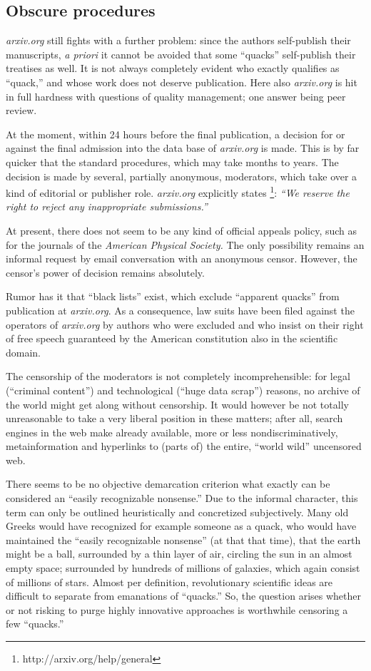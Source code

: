 \subsection{Obscure procedures}

{\it arxiv.org} still fights with a further problem:  since the authors
self-publish their manuscripts, {\it a priori} it cannot be avoided
that some ``quacks'' self-publish their treatises as well.  It is not
always completely evident who exactly qualifies as ``quack,'' and
whose work does not deserve publication.  Here also {\it arxiv.org} is
hit in full hardness with questions of quality management; one answer
being peer review.

At the moment,
within 24 hours before the final publication, a decision for or against
the final admission into the data base of {\it arxiv.org} is made.  This
is by far quicker that the standard procedures, which may take months to
years.  The decision is made by several, partially anonymous,
moderators, which take over a kind of editorial or publisher role.  {\it arxiv.org}
explicitly states \footnote{ http://arxiv.org/help/general}:
{\em ``We reserve the right to reject any inappropriate submissions.''}

At present, there does not seem to be any kind of official appeals
policy, such as for the journals of the {\it American Physical Society.}
The only possibility remains an informal request by email conversation
with an anonymous censor.  However, the censor's power of decision
remains absolutely.

Rumor has it that ``black lists'' exist, which exclude ``apparent
quacks'' from publication at {\it arxiv.org}.  As a consequence, law
suits have been filed against the operators of {\it arxiv.org} by
authors who were excluded and who insist on their right of free speech
guaranteed by the American constitution also in the scientific domain.

The censorship of the moderators is not completely incomprehensible:
 for legal (``criminal content'') and
technological (``huge data scrap'') reasons, no archive of the world
 might get along without censorship.
It would however be not totally unreasonable to take a
very liberal position in these matters; after all, search engines in
the web make already available, more or less nondiscriminatively,
metainformation and hyperlinks to (parts of) the entire, ``world wild''
uncensored web.

There seems to be no objective demarcation criterion what exactly can be
considered an ``easily recognizable nonsense.''  Due to the informal
character, this term can only be outlined heuristically and concretized
subjectively.  Many old Greeks would have recognized for example someone
as a quack, who would have maintained the ``easily recognizable
nonsense'' (at that that time), that the earth might be a ball,
surrounded by a thin  layer of air,  circling the sun in an almost empty
space; surrounded by hundreds of millions of galaxies, which again consist
of millions of stars.
Almost per definition, revolutionary scientific ideas are difficult to
separate from emanations of ``quacks.''
So, the question arises whether or not  risking
to purge  highly innovative approaches is  worthwhile censoring a few
``quacks.''

